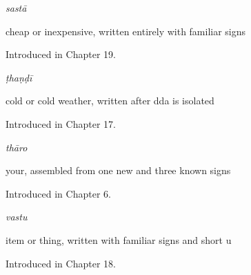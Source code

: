 \noindent\begin{minipage}[t]{\linewidth}
\raggedright
\textbf{}\enspace\emph{sastā}\par
\small cheap or inexpensive, written entirely with familiar signs\par
\footnotesize Introduced in Chapter 19.
\end{minipage}\par\medskip

\noindent\begin{minipage}[t]{\linewidth}
\raggedright
\textbf{}\enspace\emph{ṭhaṇḍī}\par
\small cold or cold weather, written after dda is isolated\par
\footnotesize Introduced in Chapter 17.
\end{minipage}\par\medskip

\noindent\begin{minipage}[t]{\linewidth}
\raggedright
\textbf{}\enspace\emph{thāro}\par
\small your, assembled from one new and three known signs\par
\footnotesize Introduced in Chapter 6.
\end{minipage}\par\medskip

\noindent\begin{minipage}[t]{\linewidth}
\raggedright
\textbf{}\enspace\emph{vastu}\par
\small item or thing, written with familiar signs and short u\par
\footnotesize Introduced in Chapter 18.
\end{minipage}\par\medskip
